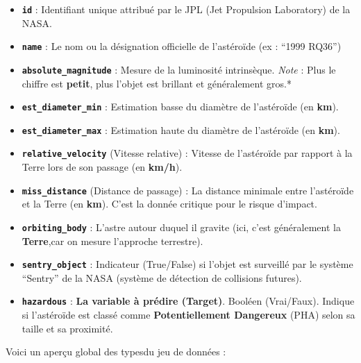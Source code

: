 \documentclass[11pt]{article}
\providecommand{\tightlist}{%
      \setlength{\itemsep}{0pt}\setlength{\parskip}{0pt}}
\begin{document}
\begin{itemize}
  \tightlist
  \item
        \textbf{\texttt{id}} : Identifiant unique attribué par le JPL (Jet
        Propulsion Laboratory) de la NASA.
  \item
        \textbf{\texttt{name}} : Le nom ou la désignation officielle de
        l'astéroïde (ex : ``1999 RQ36'')
  \item
        \textbf{\texttt{absolute\_magnitude}} : Mesure de la luminosité
        intrinsèque. \emph{Note} : Plus le chiffre est \textbf{petit}, plus
        l'objet est brillant et généralement gros.*
  \item
        \textbf{\texttt{est\_diameter\_min}} : Estimation basse du diamètre de
        l'astéroïde (en \textbf{km}).
  \item
        \textbf{\texttt{est\_diameter\_max}} : Estimation haute du diamètre de
        l'astéroïde (en \textbf{km}).
  \item
        \textbf{\texttt{relative\_velocity}} (Vitesse relative) : Vitesse de
        l'astéroïde par rapport à la Terre lors de son passage (en
        \textbf{km/h}).
  \item
        \textbf{\texttt{miss\_distance}} (Distance de passage) : La distance
        minimale entre l'astéroïde et la Terre (en \textbf{km}). C'est la
        donnée critique pour le risque d'impact.
  \item
        \textbf{\texttt{orbiting\_body}} : L'astre autour duquel il gravite
        (ici, c'est généralement la \textbf{Terre},car on mesure l'approche
        terrestre).
  \item
        \textbf{\texttt{sentry\_object}} : Indicateur (True/False) si l'objet
        est surveillé par le système ``Sentry'' de la NASA (système de
        détection de collisions futures).
  \item
        \textbf{\texttt{hazardous}} : \textbf{La variable à prédire (Target)}.
        Booléen (Vrai/Faux). Indique si l'astéroïde est classé comme
        \textbf{Potentiellement Dangereux} (PHA) selon sa taille et sa
        proximité.
\end{itemize}

Voici un aperçu global des typesdu jeu de données :
\end{document}
